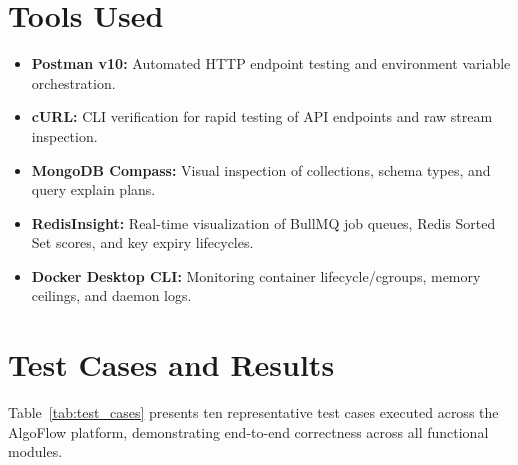 \documentclass[12pt,a4paper]{report}
\begin{document}
\section{Tools Used}
\begin{itemize}[leftmargin=*]
  \item \textbf{Postman v10:} Automated HTTP endpoint testing and environment variable orchestration.
  \item \textbf{cURL:} CLI verification for rapid testing of API endpoints and raw stream inspection.
  \item \textbf{MongoDB Compass:} Visual inspection of collections, schema types, and query explain plans.
  \item \textbf{RedisInsight:} Real-time visualization of BullMQ job queues, Redis Sorted Set scores, and key expiry lifecycles.
  \item \textbf{Docker Desktop CLI:} Monitoring container lifecycle/cgroups, memory ceilings, and daemon logs.
\end{itemize}

\section{Test Cases and Results}
Table~\ref{tab:test_cases} presents ten representative test cases executed across the AlgoFlow platform, demonstrating end-to-end correctness across all functional modules.
\end{document}
